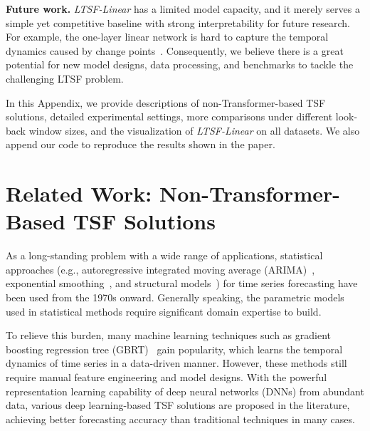 \documentclass[10pt,twocolumn,letterpaper]{article}
\newcommand{\modelname}{\emph{LTSF-Linear}\xspace}
\begin{document}
\textbf{Future work.} \modelname has a limited model capacity, and it merely serves a simple yet competitive baseline with strong interpretability for future research. For example, the one-layer linear network is hard to capture the temporal dynamics caused by change points~\cite{van2020evaluation}. Consequently, we believe there is a great potential for new model designs, data processing, and benchmarks to tackle the challenging LTSF problem. 
 \pagebreak






In this Appendix, we provide descriptions of non-Transformer-based TSF solutions, detailed experimental settings, more comparisons under different look-back window sizes, and the visualization of \modelname on all datasets. We also append our code to reproduce the results shown in the paper.



\appendix


\section{Related Work: Non-Transformer-Based TSF Solutions}
\label{sec:related_non}
As a long-standing problem with a wide range of applications, statistical approaches (e.g., autoregressive integrated moving average (ARIMA)~\cite{ariyo2014arima}, exponential smoothing~\cite{gardner1985exponential}, and structural models~\cite{harvey1990forecasting}) for time series forecasting have been used from the 1970s onward.
Generally speaking, the parametric models used in statistical methods require significant domain expertise to build. 

To relieve this burden, many machine learning techniques such as gradient boosting regression tree (GBRT)~\cite{gbrt,elsayed2021we} 
gain popularity, which learns the temporal dynamics of time series in a data-driven manner. 
However, these methods still require manual feature engineering and model designs.
With the powerful representation learning capability of deep neural networks (DNNs) from abundant data, various deep learning-based TSF solutions are proposed in the literature, achieving better forecasting accuracy than traditional techniques in many cases. 
\end{document}
